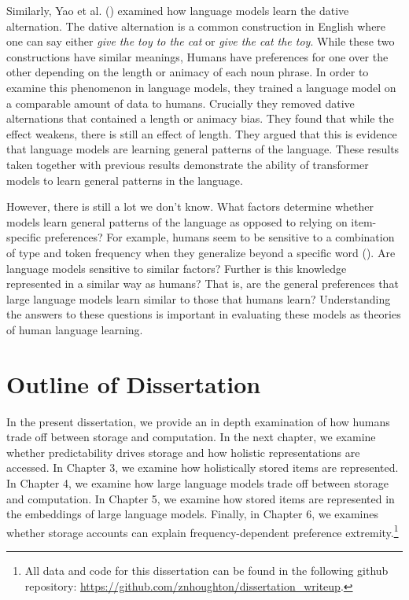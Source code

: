 \documentclass[
  12pt,
  letterpaper,
]{scrreport}
\begin{document}
Similarly, Yao et al. ()
examined how language models learn the dative alternation. The dative
alternation is a common construction in English where one can say either
\emph{give the toy to the cat} or \emph{give the cat the toy}. While
these two constructions have similar meanings, Humans have preferences
for one over the other depending on the length or animacy of each noun
phrase. In order to examine this phenomenon in language models, they
trained a language model on a comparable amount of data to humans.
Crucially they removed dative alternations that contained a length or
animacy bias. They found that while the effect weakens, there is still
an effect of length. They argued that this is evidence that language
models are learning general patterns of the language. These results
taken together with previous results demonstrate the ability of
transformer models to learn general patterns in the language.

However, there is still a lot we don't know. What factors determine
whether models learn general patterns of the language as opposed to
relying on item-specific preferences? For example, humans seem to be
sensitive to a combination of type and token frequency when they
generalize beyond a specific word
().
Are language models sensitive to similar factors? Further is this
knowledge represented in a similar way as humans? That is, are the
general preferences that large language models learn similar to those
that humans learn? Understanding the answers to these questions is
important in evaluating these models as theories of human language
learning.

\section{Outline of Dissertation}\label{sec-outline-of-dissertation}

In the present dissertation, we provide an in depth examination of how
humans trade off between storage and computation. In the next chapter,
we examine whether predictability drives storage and how holistic
representations are accessed. In Chapter 3, we examine how holistically
stored items are represented. In Chapter 4, we examine how large
language models trade off between storage and computation. In Chapter 5,
we examine how stored items are represented in the embeddings of large
language models. Finally, in Chapter 6, we examines whether storage
accounts can explain frequency-dependent preference
extremity.\footnote{All data and code for this dissertation can be found
  in the following github repository:
  \url{https://github.com/znhoughton/dissertation_writeup}.}
\end{document}
